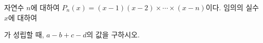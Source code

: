 자연수 $n$에 대하여 $P_n(x)=(x-1)(x-2)\times\cdots\times(x-n)$이다. 임의의 실수 $x$에 대하여 \par\smallskip{}\par\smallskip\noindent 가 성립할 때, $a-b+c-d$의 값을 구하시오. 
